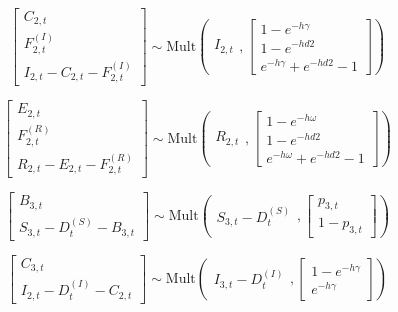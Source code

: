 \documentclass[10pt]{article}
\begin{document}
\[
\left[ \begin{array}{c}
    C_{2,t} \\
    F^{(I)}_{2,t} \\
    I_{2,t} - C_{2,t} - F^{(I)}_{2,t}
\end{array} \right]
\sim \text{Mult} 
\left( \begin{array}{c}
    I_{2,t}
\end{array}, \left[ \begin{array}{c}
    1 - e^{-h\gamma} \\
    1 - e^{-hd2} \\
    e^{-h\gamma} + e^{-hd2} - 1
\end{array} \right] \right)
\]

\[
\left[ \begin{array}{c}
    E_{2,t} \\
    F^{(R)}_{2,t} \\
    R_{2,t} - E_{2,t} - F^{(R)}_{2,t}
\end{array} \right]
\sim \text{Mult} 
\left( \begin{array}{c}
    R_{2,t}
\end{array}, \left[ \begin{array}{c}
    1 - e^{-h\omega} \\
    1 - e^{-hd2} \\
    e^{-h\omega} + e^{-hd2} - 1
\end{array} \right] \right)
\]


\[
\left[ \begin{array}{c}
    B_{3,t} \\
    S_{3,t} - D_{t}^{(S)} - B_{3,t}
\end{array} \right]
\sim \text{Mult} 
\left( \begin{array}{c}
    S_{3,t} - D_{t}^{(S)} 
\end{array}, \left[ \begin{array}{c}
    p_{3,t} \\
    1 - p_{3,t}
\end{array} \right] \right)
\]

\[
\left[ \begin{array}{c}
    C_{3,t} \\
    I_{2,t} - D_{t}^{(I)} - C_{2,t}
\end{array} \right]
\sim \text{Mult} 
\left( \begin{array}{c}
    I_{3,t} - D_{t}^{(I)} 
\end{array}, \left[ \begin{array}{c}
    1 - e^{-h\gamma} \\
    e^{-h\gamma}
\end{array} \right] \right)
\]
\end{document}
